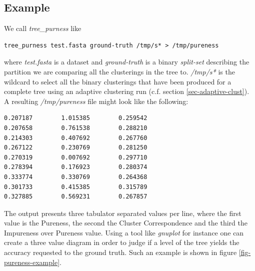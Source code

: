 \subsection{Example}
We call \emph{tree\_purness} like
\begin{lstlisting}
tree_purness test.fasta ground-truth /tmp/s* > /tmp/pureness
\end{lstlisting}
where \emph{test.fasta} is a dataset and \emph{ground-truth} is a
binary \emph{split-set} describing the partition we are comparing
all the clusterings in the tree to. \emph{/tmp/s*} is the wildcard to
select all the binary clusterings that have been produced for a
complete tree using an adaptive clustering run (c.f. section
\ref{sec-adaptive-clust}).
A resulting \emph{/tmp/pureness} file might look like the following:
\begin{lstlisting}
0.207187        1.015385        0.259542
0.207658        0.761538        0.288210
0.214303        0.407692        0.267760
0.267122        0.230769        0.281250
0.270319        0.007692        0.297710
0.278394        0.176923        0.280374
0.333774        0.330769        0.264368
0.301733        0.415385        0.315789
0.327885        0.569231        0.267857
\end{lstlisting}
The output presents three tabulator separated values per line, where
the first value
is the Pureness, the second the Cluster Correspondence and the third
the Impureness over Pureness value. Using a tool like
\emph{gnuplot} for instance one can create a three value diagram in
order to judge if a level of
the tree yields the accuracy requested to the ground truth. Such an
example is shown in figure \ref{fig-pureness-example}.
